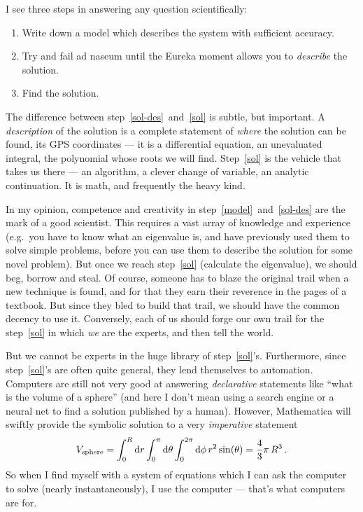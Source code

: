 \documentclass[12pt, nofootinbib, notitlepage]{revtex4}
\begin{document}
{\nobreak
	I see three steps in answering any question scientifically:

	\begin{enumerate}
		\item Write down a model which describes the system with sufficient accuracy.\label{model}
		
		\item Try and fail ad naseum until the Eureka moment
		allows you to \emph{describe} the solution.\label{sol-des}
		
		\item Find the solution.\label{sol}
	\end{enumerate}
	The difference between step~\ref{sol-des}~and~\ref{sol} is subtle, but important.
	A \emph{description} of the solution is a complete statement of 
	\emph{where} the solution can be found, its GPS coordinates ---
	it is a differential equation, 
	an unevaluated integral, the polynomial whose roots we will find.
	Step~\ref{sol} is the vehicle that takes us there ---
	an algorithm, a clever change of variable, an analytic continuation. 
	It is math, and frequently the heavy kind.
	
	In my opinion, competence and creativity in step~\ref{model}~and~\ref{sol-des}
	are the mark of a good scientist. 
	This requires a vast array of knowledge and experience
	(e.g.\ you have to know what an eigenvalue is,
	and have previously used them to solve simple problems, 
	before you can use them to describe the solution for some novel problem).
	But once we reach step~\ref{sol} (calculate the eigenvalue),
	we should beg, borrow and steal. Of course, someone has to 
	blaze the original trail when a new technique is found, 
	and for that they earn their reverence in the pages of a textbook.
	But since they bled to build that trail, 
	we should have the common decency to use it.
	Conversely, each of us should forge our own trail for the
	step~\ref{sol} in which \emph{we} are the experts, and then tell the world.
	
	But we cannot be experts in the huge library of step~\ref{sol}'s.
	Furthermore, since step~\ref{sol}'s are often quite general, 
	they lend themselves to automation.
	Computers are still not very good at answering \emph{declarative} statements like
	``what is the volume of a sphere'' (and here I don't mean using a 
	search engine or a neural net to find a solution published by a human).
	However, Mathematica will swiftly provide the 
	symbolic solution to a very \emph{imperative} statement
	\begin{equation*}
		V_{\mathrm{sphere}} = \int_0^R\mathrm{d}r\int_0^\pi\mathrm{d}\theta\int_0^{2\pi}\mathrm{d}\phi
		 \,r^2\sin(\theta) = \frac{4}{3}\pi\,R^3\,.
	\end{equation*}
	So when I find myself with a system of equations which I can 
	ask the computer to solve (nearly instantaneously),
	I use the computer --- that's what computers are for.
}
\end{document}
